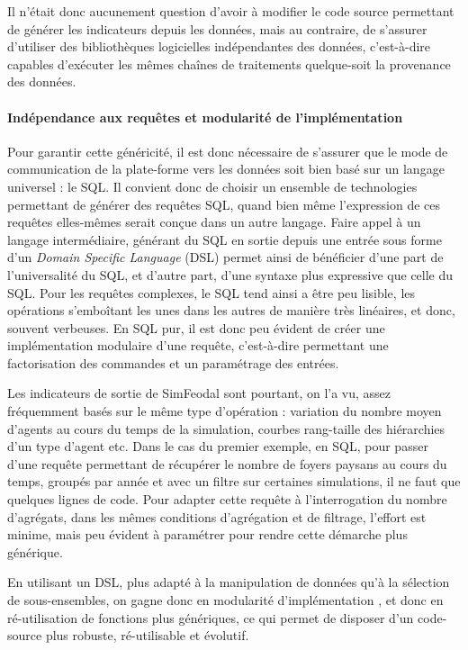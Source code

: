 Il n'était donc aucunement question d'avoir à modifier le code source permettant de générer les indicateurs depuis les données, mais au contraire, de s'assurer d'utiliser des bibliothèques logicielles indépendantes des données, c'est-à-dire capables d'exécuter les mêmes chaînes de traitements quelque-soit la provenance des données.

\paragraph*{Indépendance aux requêtes et modularité de l'implémentation}\label{par:DSL}

Pour garantir cette généricité, il est donc nécessaire de s'assurer que le mode de communication de la plate-forme vers les données soit bien basé sur un langage universel : le SQL.
Il convient donc de choisir un ensemble de technologies permettant de générer des requêtes SQL, quand bien même l'expression de ces requêtes elles-mêmes serait conçue dans un autre langage.
Faire appel à un langage intermédiaire, générant du SQL en sortie depuis une entrée sous forme d'un \og \textit{Domain Specific Language}\fg{} (DSL) permet ainsi de bénéficier d'une part de l'universalité du SQL, et d'autre part, d'une syntaxe plus expressive que celle du SQL.
Pour les requêtes complexes, le SQL tend ainsi a être peu lisible, les opérations s'emboîtant les unes dans les autres de manière très linéaires, et donc, souvent verbeuses.
En SQL pur, il est donc peu évident de créer une implémentation modulaire d'une requête, c'est-à-dire permettant une factorisation des commandes et un paramétrage des entrées.

Les indicateurs de sortie de SimFeodal sont pourtant, on l'a vu, assez fréquemment basés sur le même type d'opération : variation du nombre moyen d'agents au cours du temps de la simulation, courbes rang-taille des hiérarchies d'un type d'agent etc.
Dans le cas du premier exemple, en SQL, pour passer d'une requête permettant de récupérer le nombre de foyers paysans au cours du temps, groupés par année et avec un filtre sur certaines simulations, il ne faut que quelques lignes de code. Pour adapter cette requête à l'interrogation du nombre d'agrégats, dans les mêmes conditions d'agrégation et de filtrage, l'effort est minime, mais peu évident à paramétrer pour rendre cette démarche plus générique.

En utilisant un DSL, plus adapté à la manipulation de données qu'à la sélection de sous-ensembles, on gagne donc en modularité d'implémentation , et donc en ré-utilisation de fonctions plus génériques, ce qui permet de disposer d'un code-source plus robuste, ré-utilisable et évolutif.

